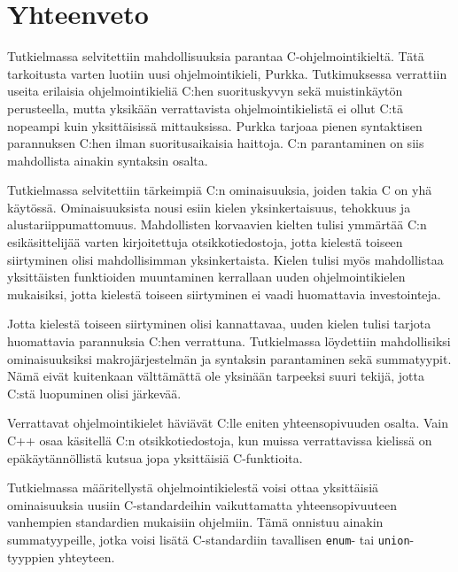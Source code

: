 \section{Yhteenveto}

Tutkielmassa selvitettiin mahdollisuuksia parantaa C-ohjelmointikieltä. Tätä
tarkoitusta varten luotiin uusi ohjelmointikieli, Purkka. Tutkimuksessa
verrattiin useita erilaisia ohjelmointikieliä C:hen suorituskyvyn sekä
muistinkäytön perusteella, mutta yksikään verrattavista ohjelmointikielistä ei
ollut C:tä nopeampi kuin yksittäisissä mittauksissa. Purkka tarjoaa pienen
syntaktisen parannuksen C:hen ilman suoritusaikaisia haittoja. C:n parantaminen
on siis mahdollista ainakin syntaksin osalta.

Tutkielmassa selvitettiin tärkeimpiä C:n ominaisuuksia, joiden takia C on yhä
käytössä. Ominaisuuksista nousi esiin kielen yksinkertaisuus, tehokkuus
ja alustariippumattomuus. Mahdollisten korvaavien kielten tulisi ymmärtää
C:n esikäsittelijää varten kirjoitettuja otsikkotiedostoja, jotta kielestä
toiseen siirtyminen olisi mahdollisimman yksinkertaista. Kielen tulisi myös
mahdollistaa yksittäisten funktioiden muuntaminen kerrallaan uuden
ohjelmointikielen mukaisiksi, jotta kielestä toiseen siirtyminen ei vaadi
huomattavia investointeja.

Jotta kielestä toiseen siirtyminen olisi kannattavaa, uuden kielen tulisi
tarjota huomattavia parannuksia C:hen verrattuna. Tutkielmassa löydettiin
mahdollisiksi ominaisuuksiksi makrojärjestelmän ja syntaksin parantaminen sekä
summatyypit. Nämä eivät kuitenkaan välttämättä ole yksinään tarpeeksi suuri
tekijä, jotta C:stä luopuminen olisi järkevää.

Verrattavat ohjelmointikielet häviävät C:lle eniten yhteensopivuuden osalta.
Vain C++ osaa käsitellä C:n otsikkotiedostoja, kun muissa verrattavissa
kielissä on epäkäytännöllistä kutsua jopa yksittäisiä C-funktioita.

Tutkielmassa määritellystä ohjelmointikielestä voisi ottaa yksittäisiä
ominaisuuksia uusiin C-standardeihin vaikuttamatta yhteensopivuuteen vanhempien
standardien mukaisiin ohjelmiin. Tämä onnistuu ainakin summatyypeille, jotka
voisi lisätä C-standardiin tavallisen \texttt{enum}- tai
\texttt{union}-tyyppien yhteyteen.
